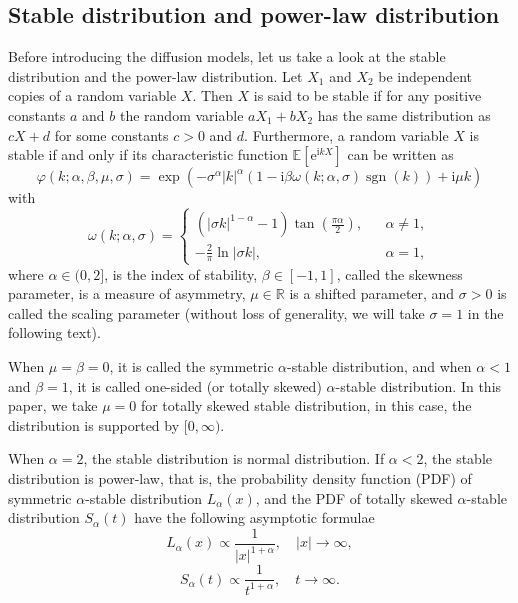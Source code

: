 \documentclass[aps, pre, preprint, amsmath, amssymb]{revtex4}
\newcommand{\e}{\mathrm{e}}
\newcommand{\I}{\mathrm{i}}
\newcommand{\R}{\mathbb{R}}
\newcommand{\E}{\mathbb{E}}
\DeclareMathOperator{\sgn}{sgn}
\newcommand{\xiaokuo}[1]{\left(#1\right)}
\newcommand{\zhongkuo}[1]{\left[#1\right]}
\begin{document}
\subsection{Stable distribution and power-law distribution}
Before introducing the diffusion models, let us take a look at the stable distribution \cite{mandelbrot1960pareto, applebaum2009levy, ken1999levy} and the power-law distribution.
Let $X_1$ and $X_2$ be independent copies of a random variable $X$. Then $X$ is said to be stable if for any positive constants $a$ and $b$ the random variable $aX_1+bX_2$ has the same distribution as $cX+d$ for some constants $c>0$ and $d$. 
Furthermore, a random variable $X$ is stable if and only if its characteristic function $\E\zhongkuo{\e^{\I kX}}$ can be written as \cite{klafter2011first, applebaum2009levy, ken1999levy}  
\begin{equation}
\varphi(k;\alpha, \beta, \mu, \sigma)=\exp\xiaokuo{-\sigma^{\alpha}|k|^{\alpha}\xiaokuo{1-\I\beta\omega(k;\alpha,\sigma)\sgn(k)}+\I\mu k}
\end{equation}
with 
\begin{equation}
\omega(k; \alpha, \sigma)=\left\{
\begin{array}{lll}
\xiaokuo{|\sigma k|^{1-\alpha}-1}\tan{\xiaokuo{\frac{\pi\alpha}{2}}}, &  &\alpha\neq 1,\\
-\frac{2}{\pi}\ln{|\sigma k|}, & & \alpha =1,
\end{array}
\right.
\end{equation}
where $\alpha\in (0,2]$, is the index of stability, $\beta\in [-1,1]$, called the skewness parameter, is a measure of asymmetry, $\mu\in\R$ is a shifted parameter, and $\sigma>0$ is called the scaling  parameter (without loss of generality, we will take $\sigma=1$ in the following text).

When $\mu=\beta=0$, it is called the symmetric $\alpha$-stable distribution, and when $\alpha < 1$ and $\beta=1$, it is called one-sided (or totally skewed) $\alpha$-stable distribution. In this paper, we take $\mu=0$ for totally skewed stable distribution, in this case, the distribution is supported by $[0,\infty)$.

When $\alpha=2$, the stable distribution is normal distribution.
If $\alpha<2$, the stable distribution is power-law, that is, the probability density function (PDF) of symmetric $\alpha$-stable distribution $L_{\alpha}(x)$, and the PDF of totally skewed $\alpha$-stable distribution $S_{\alpha}(t)$ have the following asymptotic formulae \cite{de1980simple}
\begin{equation}
	L_{\alpha}(x) \propto \frac{1}{|x|^{1+\alpha}}, 
	\quad |x|\to\infty,
\end{equation}
\begin{equation}
	S_{\alpha}(t) \propto \frac{1}{t^{1+\alpha}},
	\quad t\to\infty.
\end{equation}
\end{document}
